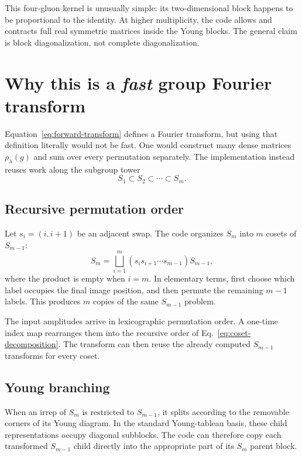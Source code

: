 \documentclass[11pt,a4paper]{article}
\begin{document}
This four-gluon kernel is unusually simple: its two-dimensional block happens
to be proportional to the identity.  At higher multiplicity, the code allows
and contracts full real symmetric matrices inside the Young blocks.  The
general claim is block diagonalization, not complete diagonalization.

\section{Why this is a \emph{fast} group Fourier transform}

Equation~\eqref{eq:forward-transform} defines a Fourier transform, but using
that definition literally would not be fast.  One would construct many dense
matrices $\rho_\lambda(g)$ and sum over every permutation separately.  The
implementation instead reuses work along the subgroup tower
\begin{equation}
  S_1\subset S_2\subset\cdots\subset S_m.
  \label{eq:subgroup-tower}
\end{equation}

\subsection{Recursive permutation order}

Let $s_i=(i,i+1)$ be an adjacent swap.  The code organizes $S_m$ into
$m$ cosets of $S_{m-1}$:
\begin{equation}
  S_m=\bigsqcup_{i=1}^{m}
      (s_i s_{i+1}\cdots s_{m-1})S_{m-1},
  \label{eq:coset-decomposition}
\end{equation}
where the product is empty when $i=m$.  In elementary terms, first choose
which label occupies the final image position, and then permute the remaining
$m-1$ labels.  This produces $m$ copies of the same $S_{m-1}$ problem.

The input amplitudes arrive in lexicographic permutation order.  A one-time
index map rearranges them into the recursive order of
Eq.~\eqref{eq:coset-decomposition}.  The transform can then reuse the already
computed $S_{m-1}$ transforms for every coset.

\subsection{Young branching}

When an irrep of $S_m$ is restricted to $S_{m-1}$, it splits according to
the removable corners of its Young diagram.  In the standard Young-tableau
basis, these child representations occupy diagonal subblocks.  The code can
therefore copy each transformed $S_{m-1}$ child directly into the
appropriate part of its $S_m$ parent block.
\end{document}
